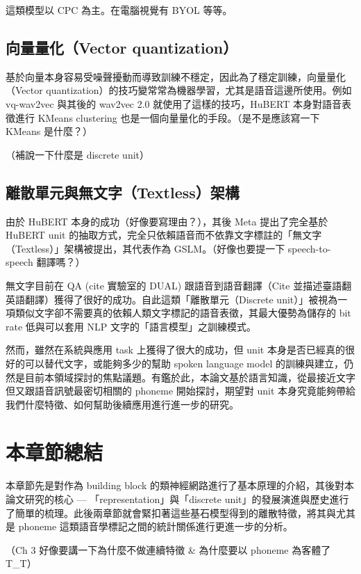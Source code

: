 這類模型以 CPC 為主。在電腦視覺有 BYOL 等等。

\subsection{向量量化（Vector quantization）}

基於向量本身容易受噪聲擾動而導致訓練不穩定，因此為了穩定訓練，向量量化（Vector quantization）的技巧變常常為機器學習，尤其是語音這邊所使用。例如 vq-wav2vec 與其後的 wav2vec 2.0 就使用了這樣的技巧，HuBERT 本身對語音表徵進行 KMeans clustering 也是一個向量量化的手段。（是不是應該寫一下 KMeans 是什麼？）

（補說一下什麼是 discrete unit）

\subsection{離散單元與無文字（Textless）架構}

由於 HuBERT 本身的成功（好像要寫理由？），其後 Meta 提出了完全基於 HuBERT unit 的抽取方式，完全只依賴語音而不依靠文字標註的「無文字（Textless）」架構被提出，其代表作為 GSLM。（好像也要提一下 speech-to-speech 翻譯嗎？）

無文字目前在 QA (cite 實驗室的 DUAL) 跟語音到語音翻譯（Cite 並描述臺語翻英語翻譯）獲得了很好的成功。自此這類「離散單元（Discrete unit）」被視為一項類似文字卻不需要真的依賴人類文字標記的語音表徵，其最大優勢為儲存的 bit rate 低與可以套用 NLP 文字的「語言模型」之訓練模式。

然而，雖然在系統與應用 task 上獲得了很大的成功，但 unit 本身是否已經真的很好的可以替代文字，或能夠多少的幫助 spoken language model 的訓練與建立，仍然是目前本領域探討的焦點議題。有鑑於此，本論文基於語言知識，從最接近文字但又跟語音訊號最密切相關的 phoneme 開始探討，期望對 unit 本身究竟能夠帶給我們什麼特徵、如何幫助後續應用進行進一步的研究。

\section{本章節總結}

本章節先是對作為 building block 的類神經網路進行了基本原理的介紹，其後對本論文研究的核心 --- 「representation」與「discrete unit」的發展演進與歷史進行了簡單的梳理。此後兩章節就會緊扣著這些基石模型得到的離散特徵，將其與尤其是 phoneme 這類語音學標記之間的統計關係進行更進一步的分析。

（Ch 3 好像要講一下為什麼不做連續特徵 \& 為什麼要以 phoneme 為客體了 T\_T）

 